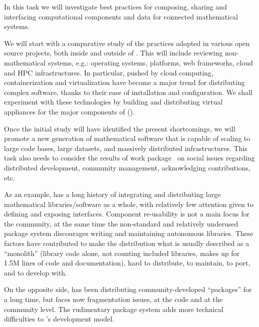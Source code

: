 \begin{workpackage}[id=component-architecture,wphases=0-48!.5,
  title=Component Architecture,lead=UV,
  PSRM=24,UVRM=8,SARM=16, USHRM=4]
\begin{tasklist}
\begin{task}[title=Modularization and packaging,id=mod-packaging,lead=UV,PM=32]


    In this task we will investigate best practices for composing,
    sharing and interfacing computational components and data for
    connected mathematical systems.

    We will start with a comparative study of the practices adopted in
    various open source projects, both inside and outside of
    \TheProject. This will include reviewing non-mathematical systems,
    e.g.: operating systems, platforms, web frameworks, cloud and HPC
    infrastructures.  In particular, pushed by cloud computing,
    containerization and virtualization have become a major trend for
    distributing complex software, thanks to their ease of
    installation and configuration. We shall experiment with these
    technologies by building and distributing virtual appliances for
    the major components of \TheProject
    ().

    Once the initial study will have identified the present
    shortcomings, we will promote a new generation of mathematical
    software that is capable of scaling to large code bases, large
    datasets, and massively distributed infrastructures. This task
    also needs to consider the results of work
    package~ on social issues regarding
    distributed development, community management, acknowledging
    contributions, etc.

    As an example, \Sage has a long history of integrating and
    distributing large mathematical libraries/software as a whole,
    with relatively few attention given to defining and exposing
    interfaces. Component re-usability is not a main focus for the
    \Sage community, at the same time the non-standard and relatively
    underused package system discourages writing and maintaining
    autonomous libraries. These factors have contributed to make the
    \Sage distribution what is usually described as a ``monolith''
    (\Sage library code alone, not counting included libraries, makes
    up for 1.5M lines of code and documentation), hard to distribute,
    to maintain, to port, and to develop with.

    On the opposite side, \GAP has been distributing
    community-developed ``\GAP packages'' for a long time, but faces
    now fragmentation issues, at the code and at the community
    level. The rudimentary package system adds more technical
    difficulties to \GAP's development model.


\end{task}
\end{tasklist}
\end{workpackage}
